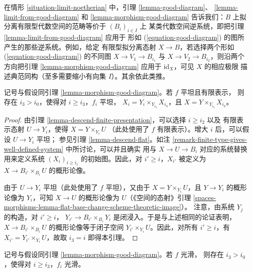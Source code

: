 \begin{remark}
\label{remark-finite-type-gives-well-defined-system}
在情形 \ref{situation-limit-noetherian} 中，引理 \ref{lemma-good-diagram}、
\ref{lemma-limit-from-good-diagram} 和 \ref{lemma-morphism-good-diagram}
告诉我们：$B$ 上拟分离有限型代数空间的范畴等价于 $(B_i)_{i \in I}$ 上
某类代数空间逆系统，即把引理 \ref{lemma-limit-from-good-diagram} 应用于
形如 (\ref{equation-good-diagram}) 的图所产生的那些逆系统。例如，给定
有限型拟分离态射 $X \to B$，若选择两个形如
(\ref{equation-good-diagram}) 的不同图 $X \to V_1 \to B_{i_1}$ 与
$X \to V_2 \to B_{i_2}$，则沿两个方向把引理
\ref{lemma-morphism-good-diagram} 应用于 $\text{id}_X$，可见 $X$ 的相应极限
描述典范同构（至多需要缩小有向集 $I$）。其余依此类推。
\end{remark}

\begin{lemma}
\label{lemma-morphism-good-diagram-flat}
记号与假设同引理 \ref{lemma-morphism-good-diagram}。若 $f$ 平坦且有限表示，
则存在 $i_3 > i_0$，使得对 $i \geq i_3$，$f_i$ 平坦，
$X_i = Y_i \times_{Y_{i_3}} X_{i_3}$，且
$X = Y \times_{Y_{i_3}} X_{i_3}$。
\end{lemma}

\begin{proof}
由引理 \ref{lemma-descend-finite-presentation}，可以选择 $i \geq i_2$ 以及
有限表示态射 $U \to Y_i$，使得 $X = Y \times_{Y_i} U$
（此处使用了 $f$ 有限表示）。增大 $i$ 后，可以假设 $U \to Y_i$ 平坦；
参见引理 \ref{lemma-descend-flat}。如注
\ref{remark-finite-type-gives-well-defined-system} 中所讨论，可以并且确实
用与 $X \to U \to B_i$ 对应的系统替换用来定义系统
$(X_i)_{i \geq i_1}$ 的初始图。因此，对 $i' \geq i$，$X_{i'}$ 被定义为
$X \to B_{i'} \times_{B_i} U$ 的概形论像。

\medskip\noindent
由于 $U \to Y_i$ 平坦（此处使用了 $f$ 平坦），又由于
$X = Y \times_{Y_i} U$，且 $Y \to Y_i$ 的概形论像为 $Y_i$，可知
$X \to U$ 的概形论像为 $U$（《空间的态射》引理
\ref{spaces-morphisms-lemma-flat-base-change-scheme-theoretic-image}）。
注意，由系统 $Y_j$ 的构造，对 $i' \geq i$，
$Y_{i'} \to B_{i'} \times_{B_i} Y_i$ 是闭浸入。于是与上述相同的论证表明，
$X \to B_{i'} \times_{B_i} U$ 的概形论像等于闭子空间
$Y_{i'} \times_{Y_i} U$。因此，对所有 $i' \geq i$，有
$X_{i'} = Y_{i'} \times_{Y_i} U$，故取 $i_3 = i$ 即得本引理。
\end{proof}

\begin{lemma}
\label{lemma-morphism-good-diagram-smooth}
记号与假设同引理 \ref{lemma-morphism-good-diagram}。若 $f$ 光滑，
则存在 $i_3 > i_0$，使得对 $i \geq i_3$，$f_i$ 光滑。
\end{lemma}


